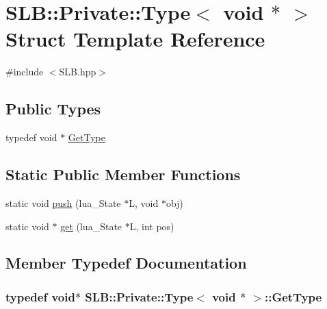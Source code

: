 \hypertarget{structSLB_1_1Private_1_1Type_3_01void_01_5_01_4}{}\section{S\+LB\+:\+:Private\+:\+:Type$<$ void $\ast$ $>$ Struct Template Reference}
\label{structSLB_1_1Private_1_1Type_3_01void_01_5_01_4}


{\ttfamily \#include $<$S\+L\+B.\+hpp$>$}

\subsection*{Public Types}
\begin{DoxyCompactItemize}
\item 
typedef void $\ast$ \hyperlink{structSLB_1_1Private_1_1Type_3_01void_01_5_01_4_aa77477ab248fdd08d2731acc371aad99}{Get\+Type}
\end{DoxyCompactItemize}
\subsection*{Static Public Member Functions}
\begin{DoxyCompactItemize}
\item 
static void \hyperlink{structSLB_1_1Private_1_1Type_3_01void_01_5_01_4_a1a586ad1b495626151c2c3badf3ac773}{push} (lua\+\_\+\+State $\ast$L, void $\ast$obj)
\item 
static void $\ast$ \hyperlink{structSLB_1_1Private_1_1Type_3_01void_01_5_01_4_ad5a493ad73a5dca51186bb30c0c511cb}{get} (lua\+\_\+\+State $\ast$L, int pos)
\end{DoxyCompactItemize}


\subsection{Member Typedef Documentation}
\subsubsection[{\texorpdfstring{Get\+Type}{GetType}}]{\setlength{\rightskip}{0pt plus 5cm}typedef void$\ast$ {\bf S\+L\+B\+::\+Private\+::\+Type}$<$ void $\ast$ $>$\+::{\bf Get\+Type}}\hypertarget{structSLB_1_1Private_1_1Type_3_01void_01_5_01_4_aa77477ab248fdd08d2731acc371aad99}{}\label{structSLB_1_1Private_1_1Type_3_01void_01_5_01_4_aa77477ab248fdd08d2731acc371aad99}


